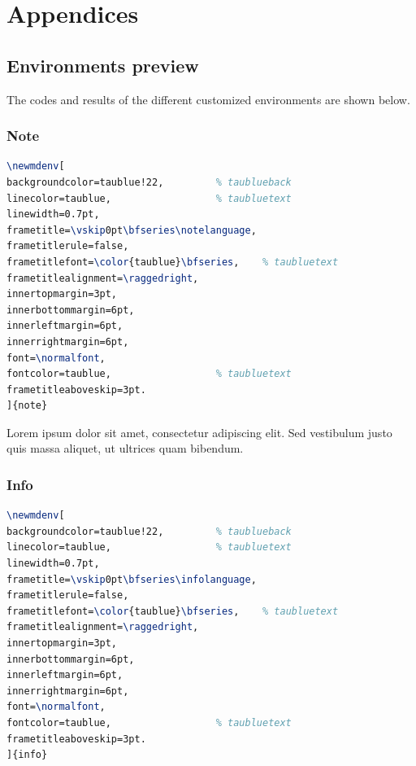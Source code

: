 \documentclass[10pt,a4paper,twoside]{tau-book}
\begin{document}
\section{Appendices}

	\subsection{Environments preview}
	
            The codes and results of the different customized environments are shown below.
		
		\subsubsection{Note}
		
			\begin{lstlisting}[language=TeX, caption=Note environment code.]
\newmdenv[
backgroundcolor=taublue!22, 		% taublueback
linecolor=taublue,					% taubluetext
linewidth=0.7pt,
frametitle=\vskip0pt\bfseries\notelanguage,
frametitlerule=false,
frametitlefont=\color{taublue}\bfseries,	% taubluetext
frametitlealignment=\raggedright,
innertopmargin=3pt,
innerbottommargin=6pt,
innerleftmargin=6pt,
innerrightmargin=6pt,
font=\normalfont,
fontcolor=taublue,					% taubluetext
frametitleaboveskip=3pt.
]{note} \end{lstlisting}
		
			\begin{note}
                    Lorem ipsum dolor sit amet, consectetur adipiscing elit. Sed vestibulum justo quis massa aliquet, ut ultrices quam bibendum.
			\end{note}

		\subsubsection{Info}
		
			\begin{lstlisting}[language=TeX, caption=Info environment code.]
\newmdenv[
backgroundcolor=taublue!22, 		% taublueback
linecolor=taublue,					% taubluetext
linewidth=0.7pt,
frametitle=\vskip0pt\bfseries\infolanguage,
frametitlerule=false,
frametitlefont=\color{taublue}\bfseries,	% taubluetext
frametitlealignment=\raggedright,
innertopmargin=3pt,
innerbottommargin=6pt,
innerleftmargin=6pt,
innerrightmargin=6pt,
font=\normalfont,
fontcolor=taublue,					% taubluetext
frametitleaboveskip=3pt.
]{info} \end{lstlisting}
			
\end{document}

